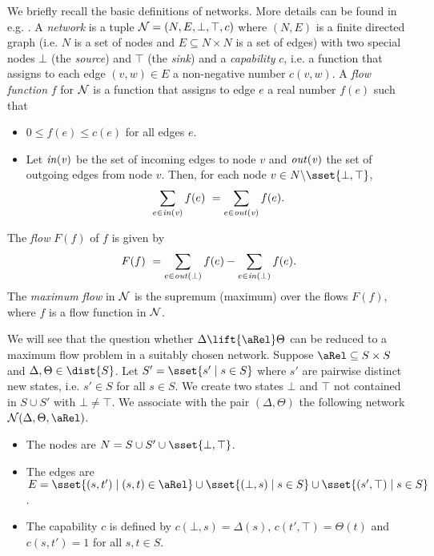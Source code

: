 \documentclass{article}
\def \CN{{\cal N}}
\def \IN{\it in}
\def \OUT{\it out}
\begin{document}
 We briefly recall the basic definitions of
networks. More details can be found in e.g. \cite{Eve79}. A
\emph{network} is a tuple $\CN=(N,E,\bot,\top,c)$ where $(N,E)$ is a
finite directed graph (i.e. $N$ is a set of nodes and $E\subseteq
N\times N$ is a set of edges) with two special nodes $\bot$ (the
\emph{source}) and $\top$ (the \emph{sink}) and a \emph{capability}
$c$, i.e. a function that assigns to each edge $(v,w)\in E$ a
non-negative number $c(v,w)$. A \emph{flow function} $f$ for $\CN$
is a function that assigns to edge $e$ a real number $f(e)$ such
that
\begin{itemize}
\item $0\leq f(e)\leq c(e)$ for all edges $e$.
\item Let $\IN(v)$ be the set of incoming edges to node $v$ and
  $\OUT(v)$ the set of outgoing edges from node $v$. Then, for each
  node $v\in N\backslash\sset{\bot,\top}$,
  \[\sum_{e\in\IN(v)}f(e) ~= \sum_{e\in\OUT(v)}f(e).\]
\end{itemize}
The \emph{flow} $F(f)$ of $f$ is given by
\[F(f) ~= \sum_{e\in\OUT(\bot)}f(e) - \sum_{e\in\IN(\bot)}f(e).\]
The \emph{maximum flow} in $\CN$ is the supremum (maximum) over the
flows $F(f)$, where $f$ is a flow function in $\CN$.

 We will see that
the question whether $\Delta\lift{\aRel}\Theta$ can be reduced to a
maximum flow problem in a suitably chosen network. Suppose
$\aRel\subseteq S\times S$ and $\Delta,\Theta\in\dist{S}$. Let
$S'=\sset{s'\mid s\in
  S}$ where $s'$ are pairwise distinct new states, i.e. $s'\in S$ for
all $s\in S$. We create two states $\bot$ and $\top$ not contained
in $S\cup S'$ with $\bot\not=\top$. We associate with the pair
$(\Delta,\Theta)$
 the following network $\CN(\Delta,\Theta,\aRel)$. \begin{itemize}
\item The nodes are $N=S\cup S'\cup\sset{\bot,\top}$.
\item The edges are $E=\sset{(s,t')\mid
    (s,t)\in\aRel}\cup\sset{(\bot,s)\mid s\in S}\cup\sset{(s',\top)\mid
    s\in S}$.
\item The capability $c$ is defined by $c(\bot,s)=\Delta(s)$,
  $c(t',\top)=\Theta(t)$ and $c(s,t')=1$ for all $s,t\in S$.
\end{itemize}
\end{document}
